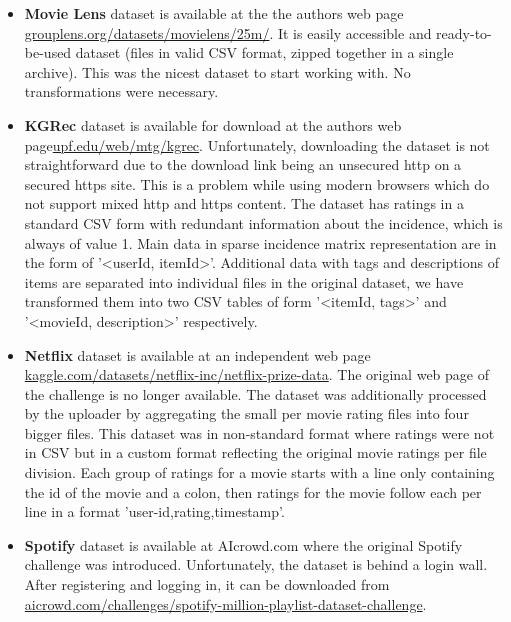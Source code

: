 \begin{itemize}
    \item \textbf{Movie Lens} dataset is available at the the authors web page \newline \href{https://grouplens.org/datasets/movielens/25m/}{grouplens.org/datasets/movielens/25m/}. It is easily accessible and ready-to-be-used dataset (files in valid CSV format, zipped together in a single archive). This was the nicest dataset to start working with. No transformations were necessary.
    
    \item \textbf{KGRec} dataset is available for download at the authors web page\newline \href{https://www.upf.edu/web/mtg/kgrec}{upf.edu/web/mtg/kgrec}. Unfortunately, downloading the dataset is not straightforward due to the download link being an unsecured http on a secured https site. This is a problem while using modern browsers which do not support mixed http and https content. The dataset has ratings in a standard CSV form with redundant information about the incidence, which is always of value 1. Main data in sparse incidence matrix representation are in the form of '\textless userId, itemId\textgreater'. Additional data with tags and descriptions of items are separated into individual files in the original dataset, we have transformed them into two CSV tables of form '\textless itemId, tags\textgreater' and '\textless movieId, description\textgreater' respectively.
    
    \item \textbf{Netflix} dataset is available at an independent web page
    \newline
    \href{https://www.kaggle.com/datasets/netflix-inc/netflix-prize-data}{kaggle.com/datasets/netflix-inc/netflix-prize-data}.
    The original web page of the challenge is no longer available. The dataset was additionally processed by the uploader by aggregating the small per movie rating files into four bigger files. This dataset was in non-standard format where ratings were not in CSV but in a custom format reflecting the original movie ratings per file division. Each group of ratings for a movie starts with a line only containing the id of the movie and a colon, then ratings for the movie follow each per line in a format 'user-id,rating,timestamp'.
    
    \item \textbf{Spotify} dataset is available at AIcrowd.com where the original Spotify challenge was introduced. Unfortunately, the dataset is behind a login wall. After registering and logging in, it can be downloaded from \newline\href{https://www.aicrowd.com/challenges/spotify-million-playlist-dataset-challenge}{aicrowd.com/challenges/spotify-million-playlist-dataset-challenge}.
    \newline
    

\end{itemize}

